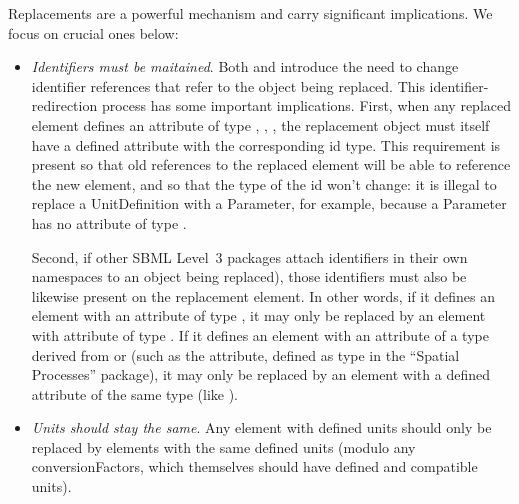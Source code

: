 Replacements are a powerful mechanism and carry significant
implications.  We focus on crucial ones below:

\begin{itemize}

\item \emph{Identifiers must be maitained}.  Both
  \ReplacedElement and \ReplacedBy introduce the need to change
  identifier references that refer to the object being replaced.  This
  identifier-redirection process has some important implications.
  First, when any replaced element defines an attribute of type 
  , , ,
  the replacement object must itself have a defined attribute with the
  corresponding id type.  This requirement
  is present so that old references to the replaced element will be able
  to reference the new element, and so that the type of the id won't change:
  it is illegal to replace a UnitDefinition with a Parameter, for
  example, because a Parameter has no attribute of type .

  Second, if other SBML Level~3 packages attach identifiers
  in their own namespaces to an object being replaced), those identifiers
  must also be likewise present on the replacement element.  In other words, if
  it defines an element with an attribute of type , it may only
  be replaced by an element with attribute of type .  If it defines
  an element with an attribute of a type derived from  or  (such as the 
   attribute, defined as type  in the
  ``Spatial Processes'' package), it may only be replaced by an element with
  a defined attribute of the same type (like ).


\item \emph{Units should stay the same}.  Any element with defined units
  should only be replaced by elements with the same defined units (modulo
  any conversionFactors, which themselves should have defined and compatible
  units).  


\end{itemize}
